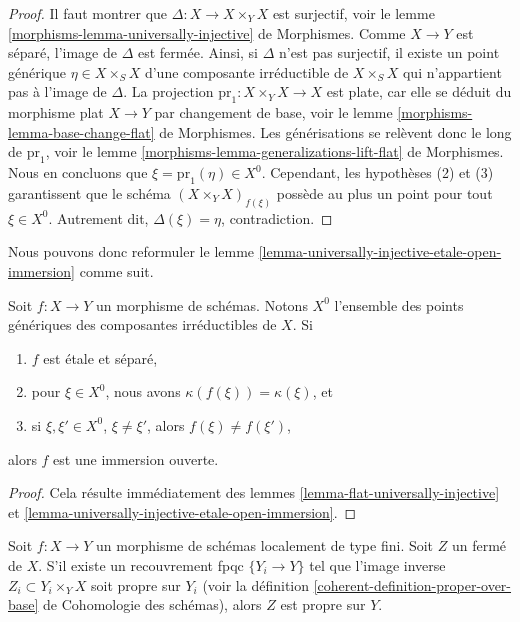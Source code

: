 \begin{proof}
Il faut montrer que $\Delta : X \to X \times_Y X$ est surjectif, voir le
lemme \ref{morphisms-lemma-universally-injective} de Morphismes.
Comme $X \to Y$ est séparé, l'image de $\Delta$ est fermée.
Ainsi, si $\Delta$ n'est pas surjectif, il existe un point générique
$\eta \in X \times_S X$ d'une composante irréductible de $X \times_S X$
qui n'appartient pas à l'image de $\Delta$. La projection
$\text{pr}_1 : X \times_Y X \to X$
est plate, car elle se déduit du morphisme plat $X \to Y$ par changement de
base, voir le lemme \ref{morphisms-lemma-base-change-flat} de Morphismes.
Les générisations se relèvent donc le long de $\text{pr}_1$, voir le
lemme \ref{morphisms-lemma-generalizations-lift-flat} de Morphismes.
Nous en concluons que $\xi = \text{pr}_1(\eta) \in X^0$.
Cependant, les hypothèses (2) et (3) garantissent que le schéma
$(X \times_Y X)_{f(\xi)}$ possède au plus un point pour tout $\xi \in X^0$.
Autrement dit, $\Delta(\xi) = \eta$, contradiction.
\end{proof}

\noindent
Nous pouvons donc reformuler le
lemme \ref{lemma-universally-injective-etale-open-immersion} comme suit.

\begin{lemma}
\label{lemma-characterize-open-immersion}
Soit $f : X \to Y$ un morphisme de schémas. Notons $X^0$ l'ensemble
des points génériques des composantes irréductibles de $X$. Si
\begin{enumerate}
\item $f$ est \'etale et séparé,
\item pour $\xi \in X^0$, nous avons $\kappa(f(\xi)) = \kappa(\xi)$, et
\item si $\xi, \xi' \in X^0$, $\xi \not = \xi'$, alors
$f(\xi) \not = f(\xi')$,
\end{enumerate}
alors $f$ est une immersion ouverte.
\end{lemma}

\begin{proof}
Cela résulte immédiatement des lemmes
\ref{lemma-flat-universally-injective} et
\ref{lemma-universally-injective-etale-open-immersion}.
\end{proof}

\begin{lemma}
\label{lemma-descending-property-proper-over-base}
Soit $f : X \to Y$ un morphisme de schémas localement de type fini.
Soit $Z$ un fermé de $X$. S'il existe un recouvrement fpqc
$\{Y_i \to Y\}$ tel que l'image inverse $Z_i \subset Y_i \times_Y X$
soit propre sur $Y_i$
(voir la définition \ref{coherent-definition-proper-over-base}
de Cohomologie des schémas),
alors $Z$ est propre sur $Y$.
\end{lemma}

